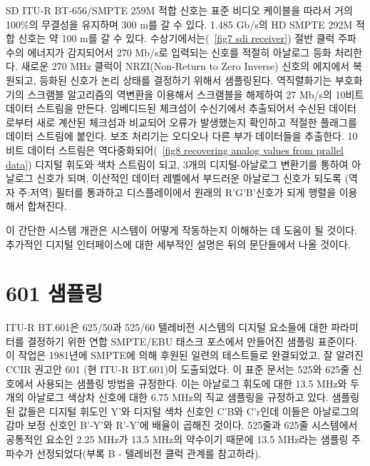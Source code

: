 SD ITU-R BT-656/SMPTE 259M 적합 신호는 표준 비디오 케이블을 따라서 거의 100\%의 무결성을 유지하며 300 m를 갈 수 있다. 1.485 Gb/s의 HD SMPTE 292M 적합 신호는 약 100 m를 갈 수 있다.
수상기에서는(\figurename~\ref{fig7 sdi receiver}) 절반 클럭 주파수의 에너지가 감지되어서 270 Mb/s로 입력되는 신호를 적절히 아날로그 등화 처리한다. 새로운 270 MHz 클럭이 NRZI(Non-Return to Zero Inverse) 신호의 에지에서 복원되고, 등화된 신호가 논리 상태를 결정하기 위해서 샘플링된다.
역직렬화기는 부호화기의 스크램블 알고리즘의 역변환을 이용해서 스크램블을 해제하여 27 Mb/s의 10비트 데이터 스트림을 만든다. 임베디드된 체크섬이 수신기에서 추출되어서 수신된 데이터로부터 새로 계산된 체크섬과 비교되어 오류가 발생했는지 확인하고 적절한 플래그를 데이터 스트림에 붙인다.
보조 처리기는 오디오나 다른 부가 데이터들을 추출한다.
10비트 데이터 스트림은 역다중화되어(\figurename~\ref{fig8 recovering analog values from prallel data}) 디지털 휘도와 색차 스트림이 되고, 3개의 디지털-아날로그 변환기를 통하여 아날로그 신호가 되며, 이산적인 데이터 레벨에서 부드러운 아날로그 신호가 되도록 (역자 주:저역) 필터를 통과하고 디스플레이에서 원래의 R'G'B'신호가 되게 행렬을 이용해서 합쳐진다.

이 간단한 시스템 개관은 시스템이 어떻게 작동하는지 이해하는 데 도움이 될 것이다. 추가적인 디지털 인터페이스에 대한 세부적인 설명은 뒤의 문단들에서 나올 것이다.

\section{601 샘플링}
ITU-R BT.601은 625/50과 525/60 텔레비전 시스템의 디지털 요소들에 대한 파라미터를 결정하기 위한 연합 SMPTE/EBU 태스크 포스에서 만들어진 샘플링 표준이다.
이 작업은 1981년에 SMPTE에 의해 후원된 일련의 테스트들로 완결되었고, 잘 알려진 CCIR 권고안 601 (현 ITU-R BT.601)이 도출되었다.
이 표준 문서는 525와 625줄 신호에서 사용되는 샘플링 방법을 규정한다. 이는 아날로그 휘도에 대한 13.5 MHz와 두 개의 아날로그 색상차 신호에 대한 6.75 MHz의 직교 샘플링을 규정하고 있다.
샘플링된 값들은 디지털 휘도인 Y'와 디지털 색차 신호인 C'B와 C'r인데 이들은 아날로그의 감마 보정 신호인 B'-Y'와 R'-Y'에 배율이 곱해진 것이다.
525줄과 625줄 시스템에서 공통적인 요소인 2.25 MHz가 13.5 MHz의 약수이기 때문에 13.5 MHz라는 샘플링 주파수가 선정되었다(부록 B - 텔레비전 클럭 관계를 참고하라).

